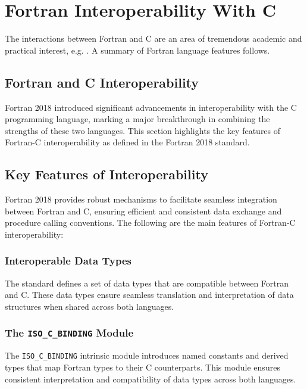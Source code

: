 % 

\section{Fortran Interoperability With C}

The interactions between Fortran and C are an area of tremendous academic and practical interest, e.g. \cite{8745480, 4548209, arabas2014formula}. A summary of Fortran language features follows.

\subsection{Fortran and C Interoperability}

Fortran 2018 introduced significant advancements in interoperability with the C programming language, marking a major breakthrough in combining the strengths of these two languages. This section highlights the key features of Fortran-C interoperability as defined in the Fortran 2018 standard.

\subsection{Key Features of Interoperability}

Fortran 2018 provides robust mechanisms to facilitate seamless integration between Fortran and C, ensuring efficient and consistent data exchange and procedure calling conventions. The following are the main features of Fortran-C interoperability:

\subsubsection{Interoperable Data Types}
The standard defines a set of data types that are compatible between Fortran and C. These data types ensure seamless translation and interpretation of data structures when shared across both languages.

\subsubsection{The \texttt{ISO\_C\_BINDING} Module}
The \texttt{ISO\_C\_BINDING} intrinsic module introduces named constants and derived types that map Fortran types to their C counterparts. This module ensures consistent interpretation and compatibility of data types across both languages.

